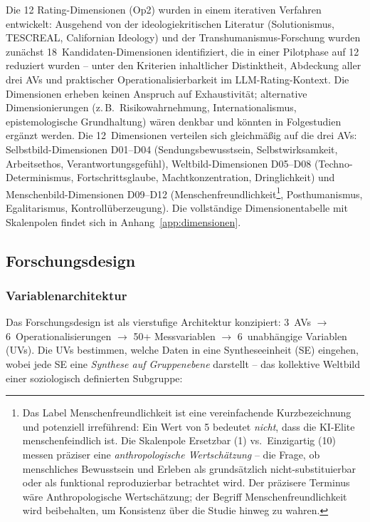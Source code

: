 \documentclass[12pt,a4paper]{article}
\begin{document}
Die 12 Rating-Dimensionen (Op2) wurden in einem iterativen Verfahren entwickelt: Ausgehend von der ideologiekritischen Literatur (Solutionismus, TESCREAL, Californian Ideology) und der Transhumanismus-Forschung wurden zun\"achst 18~Kandidaten-Dimensionen identifiziert, die in einer Pilotphase auf 12 reduziert wurden -- unter den Kriterien inhaltlicher Distinktheit, Abdeckung aller drei AVs und praktischer Operationalisierbarkeit im LLM-Rating-Kontext. Die Dimensionen erheben keinen Anspruch auf Exhaustivit\"at; alternative Dimensionierungen (z.\,B.\ Risikowahrnehmung, Internationalismus, epistemologische Grundhaltung) w\"aren denkbar und k\"onnten in Folgestudien erg\"anzt werden. Die 12~Dimensionen verteilen sich gleichm\"a\ss{}ig auf die drei AVs: Selbstbild-Dimensionen D01--D04 (Sendungsbewusstsein, Selbstwirksamkeit, Arbeitsethos, Verantwortungsgef\"uhl), Weltbild-Dimensionen D05--D08 (Techno-Determinismus, Fortschrittsglaube, Machtkonzentration, Dringlichkeit) und Menschenbild-Dimensionen D09--D12 (Menschenfreundlichkeit\footnote{Das Label \glqq Menschenfreundlichkeit\grqq{} ist eine vereinfachende Kurzbezeichnung und potenziell irref\"uhrend: Ein Wert von 5 bedeutet \emph{nicht}, dass die KI-Elite \glqq menschenfeindlich\grqq{} ist. Die Skalenpole \glqq Ersetzbar\grqq{} (1) vs.\ \glqq Einzigartig\grqq{} (10) messen pr\"aziser eine \emph{anthropologische Wertsch\"atzung} -- die Frage, ob menschliches Bewusstsein und Erleben als grunds\"atzlich nicht-substituierbar oder als funktional reproduzierbar betrachtet wird. Der pr\"azisere Terminus w\"are \glqq Anthropologische Wertsch\"atzung\grqq; der Begriff \glqq Menschenfreundlichkeit\grqq{} wird beibehalten, um Konsistenz \"uber die Studie hinweg zu wahren.}, Posthumanismus, Egalitarismus, Kontroll\"uberzeugung). Die vollst\"andige Dimensionentabelle mit Skalenpolen findet sich in Anhang~\ref{app:dimensionen}.


\subsection{Forschungsdesign}
\label{sec:methodik:design}

\subsubsection{Variablenarchitektur}

Das Forschungsdesign ist als vierstufige Architektur konzipiert: 3~AVs $\to$ 6~Operationalisierungen $\to$ 50+ Messvariablen $\to$ 6~unabh\"angige Variablen (UVs). Die UVs bestimmen, welche Daten in eine Syntheseeinheit (SE) eingehen, wobei jede SE eine \emph{Synthese auf Gruppenebene} darstellt -- das kollektive Weltbild einer soziologisch definierten Subgruppe:
\end{document}
